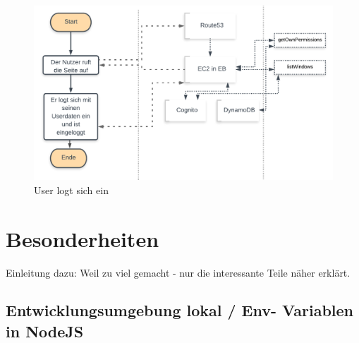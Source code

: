 \documentclass[a4paper, 12pt]{scrreprt}
\renewcommand\_{\textunderscore\allowbreak}
\begin{document}
\begin{figure}[h]
\centering
\includegraphics[scale=0.35]{login-flow.png} 
\caption{User logt sich ein}
\end{figure}





\chapter{Besonderheiten}
Einleitung dazu: Weil zu viel gemacht - nur die interessante Teile näher erklärt.

\section{Entwicklungsumgebung lokal / Env- Variablen in NodeJS}
\end{document}
